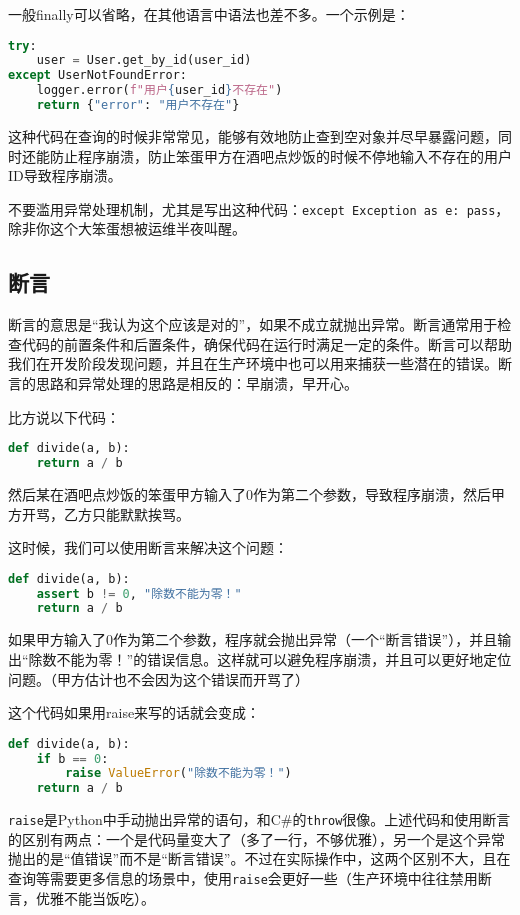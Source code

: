 \documentclass[../main.tex]{subfiles}
\begin{document}
一般finally可以省略，在其他语言中语法也差不多。一个示例是：
\begin{lstlisting}[language=Python]
try:
    user = User.get_by_id(user_id)
except UserNotFoundError:
    logger.error(f"用户{user_id}不存在")
    return {"error": "用户不存在"}
\end{lstlisting}

这种代码在查询的时候非常常见，能够有效地防止查到空对象并尽早暴露问题，同时还能防止程序崩溃，防止笨蛋甲方在酒吧点炒饭的时候不停地输入不存在的用户ID导致程序崩溃。

\begin{caution}
  不要滥用异常处理机制，尤其是写出这种代码：\texttt{except Exception as e: pass}，除非你这个大笨蛋想被运维半夜叫醒。
\end{caution}

\subsection{断言}

断言的意思是“我认为这个应该是对的”，如果不成立就抛出异常。断言通常用于检查代码的前置条件和后置条件，确保代码在运行时满足一定的条件。断言可以帮助我们在开发阶段发现问题，并且在生产环境中也可以用来捕获一些潜在的错误。断言的思路和异常处理的思路是相反的：早崩溃，早开心。

比方说以下代码：

\begin{lstlisting}[language=Python]
def divide(a, b):
    return a / b
\end{lstlisting}

然后某在酒吧点炒饭的笨蛋甲方输入了0作为第二个参数，导致程序崩溃，然后甲方开骂，乙方只能默默挨骂。

这时候，我们可以使用断言来解决这个问题：
\begin{lstlisting}[language=Python]
def divide(a, b):
    assert b != 0, "除数不能为零！"
    return a / b
\end{lstlisting}

如果甲方输入了0作为第二个参数，程序就会抛出异常（一个“断言错误”），并且输出“除数不能为零！”的错误信息。这样就可以避免程序崩溃，并且可以更好地定位问题。（甲方估计也不会因为这个错误而开骂了）

这个代码如果用raise来写的话就会变成：
\begin{lstlisting}[language=Python]
def divide(a, b):
    if b == 0:
        raise ValueError("除数不能为零！")
    return a / b
\end{lstlisting}
\texttt{raise}是Python中手动抛出异常的语句，和C\#的\texttt{throw}很像。上述代码和使用断言的区别有两点：一个是代码量变大了（多了一行，不够优雅），另一个是这个异常抛出的是“值错误”而不是“断言错误”。不过在实际操作中，这两个区别不大，且在查询等需要更多信息的场景中，使用\texttt{raise}会更好一些（生产环境中往往禁用断言，优雅不能当饭吃）。
\end{document}
